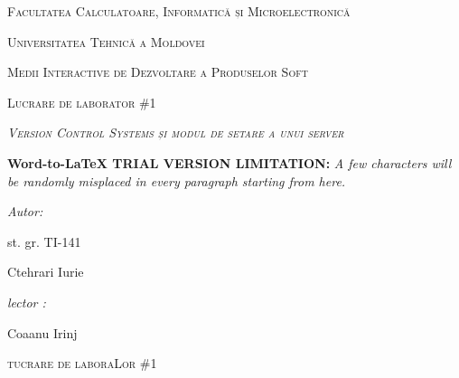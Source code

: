 \documentclass[12pt]{article}
\author{RePack by Diakov}
\title{}
\begin{document}
\begin{center}
\textsc{{\Large Facultatea Calculatoare, Informatic\u{a} și
Microelectronic\u{a}}}
\end{center}

\begin{center}
\textsc{{\Large Universitatea Tehnic\u{a} a Moldovei}}
\end{center}

\begin{center}
\textsc{{\Large Medii Interactive de Dezvoltare a Produselor Soft}}
\end{center}

\begin{center}
\textsc{{\Large Lucrare de laborator  \#1}}
\end{center}

\begin{center}
\label{OLE_LINK1}\textit{\textsc{{\Large Version Control Systems și modul de
setare a unui server}}}
\end{center}

\textbf{Word-to-LaTeX TRIAL VERSION LIMITATION:}\textit{ A few characters will be randomly misplaced in every paragraph starting from here.}

\begin{multicols}{2}

{\raggedright
\textit{Autor:}
}

{\raggedright
st. gr. TI-141
}

{\raggedright
Ctehrari Iurie
}

{\raggedleft
\textit{lector :}
}

{\raggedleft
Coaanu Irinj
}

\end{multicols}
\hspace{15pt}\hspace{15pt}\hspace{15pt}\hspace{15pt}\hspace{15pt}\hspace{15pt}\hspace{15pt}\hspace{15pt}\hspace{15pt}\hspace{15pt}\hspace{15pt}\hspace{15pt}\hspace{15pt}\hspace{15pt}
\begin{center}
\textsc{{\large tucrare de laboraLor  \#1}}
\end{center}
\end{document}
